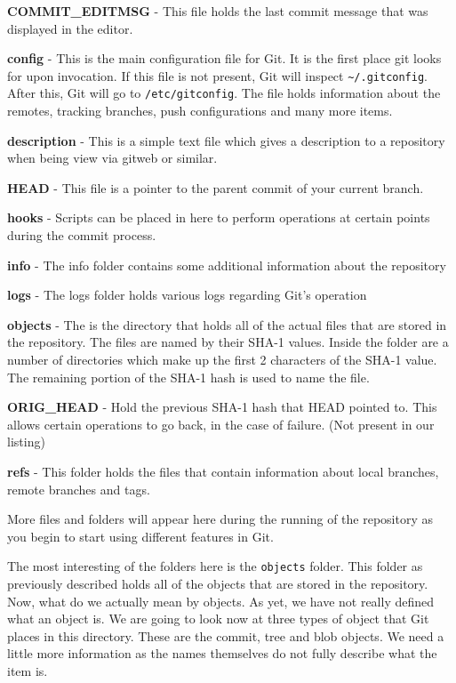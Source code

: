\textbf{COMMIT\_EDITMSG} - This file holds the last commit message that was displayed in the editor.

\textbf{config} - This is the main configuration file for Git.
It is the first place git looks for upon invocation.
If this file is not present, Git will inspect \texttt{\textasciitilde{}/.gitconfig}.
After this, Git will go to \texttt{/etc/gitconfig}.
The file holds information about the remotes, tracking branches, push configurations and many more items.

\textbf{description} - This is a simple text file which gives a description to a repository when being view via gitweb or similar.

\textbf{HEAD} - This file is a pointer to the parent commit of your current branch.

\textbf{hooks} - Scripts can be placed in here to perform operations at certain points during the commit process.

\textbf{info} - The info folder contains some additional information about the repository

\textbf{logs} - The logs folder holds various logs regarding Git's operation

\textbf{objects} - The is the directory that holds all of the actual files that are stored in the repository.
The files are named by their SHA-1 values.
Inside the folder are a number of directories which make up the first 2 characters of the SHA-1 value.
The remaining portion of the SHA-1 hash is used to name the file.

\textbf{ORIG\_HEAD} - Hold the previous SHA-1 hash that HEAD pointed to.
This allows certain operations to go back, in the case of failure.
(Not present in our listing)

\textbf{refs} - This folder holds the files that contain information about local branches, remote branches and tags.

More files and folders will appear here during the running of the repository as you begin to start using different features in Git.

The most interesting of the folders here is the \texttt{objects} folder.
This folder as previously described holds all of the objects that are stored in the repository.
Now, what do we actually mean by objects.
As yet, we have not really defined what an object is.
We are going to look now at three types of object that Git places in this directory.
These are the commit, tree and blob objects.
We need a little more information as the names themselves do not fully describe what the item is.

